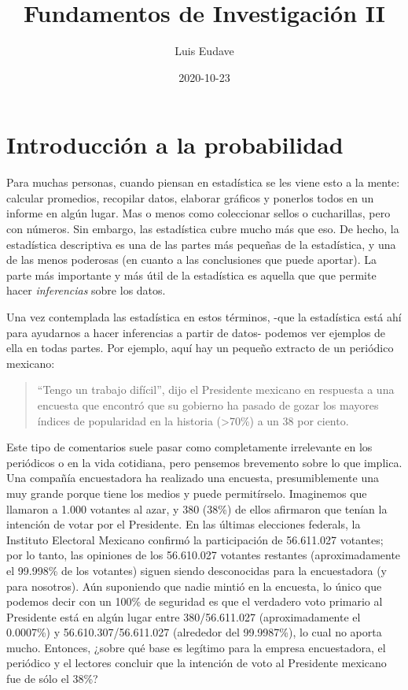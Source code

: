 \documentclass[spanish,]{book}
\title{Fundamentos de Investigación II}
\author{Luis Eudave}
\date{2020-10-23}
\begin{document}
\maketitle

{
\setcounter{tocdepth}{1}
\tableofcontents
}
\chapter{Introducción a la probabilidad}\label{probability}

Para muchas personas, cuando piensan en estadística se les viene esto a
la mente: calcular promedios, recopilar datos, elaborar gráficos y
ponerlos todos en un informe en algún lugar. Mas o menos como
coleccionar sellos o cucharillas, pero con números. Sin embargo, las
estadística cubre mucho más que eso. De hecho, la estadística
descriptiva es una de las partes más pequeñas de la estadística, y una
de las menos poderosas (en cuanto a las conclusiones que puede aportar).
La parte más importante y más útil de la estadística es aquella que que
permite hacer \emph{inferencias} sobre los datos.

Una vez contemplada las estadística en estos términos, -que la
estadística está ahí para ayudarnos a hacer inferencias a partir de
datos- podemos ver ejemplos de ella en todas partes. Por ejemplo, aquí
hay un pequeño extracto de un periódico mexicano:

\begin{quote}
``Tengo un trabajo difícil'', dijo el Presidente mexicano en respuesta a
una encuesta que encontró que su gobierno ha pasado de gozar los mayores
índices de popularidad en la historia (\textgreater{}70\%) a un 38 por
ciento.
\end{quote}

Este tipo de comentarios suele pasar como completamente irrelevante en
los periódicos o en la vida cotidiana, pero pensemos brevemento sobre lo
que implica. Una compañía encuestadora ha realizado una encuesta,
presumiblemente una muy grande porque tiene los medios y puede
permitírselo. Imaginemos que llamaron a 1.000 votantes al azar, y 380
(38\%) de ellos afirmaron que tenían la intención de votar por el
Presidente. En las últimas elecciones federals, la Instituto Electoral
Mexicano confirmó la participación de 56.611.027 votantes; por lo tanto,
las opiniones de los 56.610.027 votantes restantes (aproximadamente el
99.998\% de los votantes) siguen siendo desconocidas para la
encuestadora (y para nosotros). Aún suponiendo que nadie mintió en la
encuesta, lo único que podemos decir con un 100\% de seguridad es que el
verdadero voto primario al Presidente está en algún lugar entre
380/56.611.027 (aproximadamente el 0.0007\%) y 56.610.307/56.611.027
(alrededor del 99.9987\%), lo cual no aporta mucho. Entonces, ¿sobre qué
base es legítimo para la empresa encuestadora, el periódico y el
lectores concluir que la intención de voto al Presidente mexicano fue de
sólo el 38\%?
\end{document}
